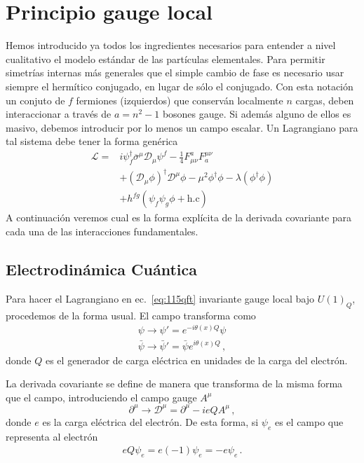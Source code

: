 \chapter{Principio gauge local}

Hemos introducido ya todos los ingredientes necesarios para entender a nivel cualitativo el modelo estándar de las partículas elementales. Para permitir simetrías internas más generales que el simple cambio de fase es necesario usar siempre el hermítico conjugado, en lugar de sólo el conjugado. Con esta notación un conjuto de $f$ fermiones (izquierdos) que conserván localmente $n$ cargas, deben interaccionar a través de $a=n^2-1$ bosones gauge. Si además alguno de ellos es masivo, debemos introducir por lo menos un campo escalar. Un Lagrangiano para tal sistema debe tener la forma genérica
\begin{align}
  \mathcal{L}=&i \psi^{\dagger}_f \overline{\sigma}^{\mu}\mathcal{D}_{\mu} \psi^f-\frac{1}{4}F_{\mu\nu}^{a} F^{\mu\nu}_a \nonumber\\
              &+\left( \mathcal{D}_{\mu}\phi \right)^{\dagger} \mathcal{D}^{\mu}\phi-\mu^2 \phi^{\dagger} \phi-\lambda \left(\phi^{\dagger} \phi  \right) \nonumber\\
              &+h^{fg} \left( \psi_f\psi_g \phi + \text{h.c} \right)
 \end{align}
A continuación veremos cual es la forma explícita de la derivada covariante para cada una de las interacciones fundamentales.

\section{Electrodinámica Cuántica}
\label{sec:electr-cuant}

Para hacer el Lagrangiano en ec.~\eqref{eq:115qft} invariante gauge local bajo $U(1)_Q$, procedemos de la forma usual. El campo transforma como
\begin{align}
  \psi\to\psi'=e^{-i\theta(x)Q}\psi\nonumber\\
  \bar{\psi}\to\bar{\psi}'=\bar{\psi}e^{i\theta(x)Q}\,,
\end{align}
donde $Q$ es el generador de carga eléctrica en unidades de la carga del electrón.

La derivada covariante se define de manera que transforma de la misma forma que el campo, introduciendo el campo gauge $A^\mu$
\begin{equation}
  \label{eq:202qft}
  \partial^\mu\to\mathcal{D}^\mu=\partial^\mu-ieQA^\mu\,,
\end{equation}
donde $e$ es la carga eléctrica del electrón. De esta forma, si $\psi_e$ es el campo que representa al electrón
\begin{align}
  eQ \psi_e=e(-1)\psi_e=-e \psi_e\,.
\end{align}

